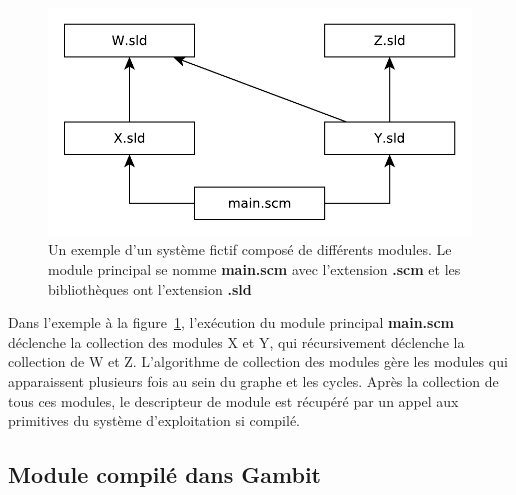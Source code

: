 \begin{figure}[ht]
  \includegraphics{figures/system-example}
  \caption{Un exemple d'un système fictif composé de différents modules.
  Le module principal se nomme \textbf{main.scm} avec l'extension \textbf{.scm}
  et les bibliothèques ont l'extension \textbf{.sld}}
  \label{fig:system-dependency-example}
\end{figure}


Dans l'exemple à la figure~\ref{fig:system-dependency-example}, l'exécution du module principal
\textbf{main.scm} déclenche la collection des modules X et Y, qui récursivement
déclenche la collection de W et Z.  L'algorithme de collection des modules gère
les modules qui apparaissent plusieurs fois au sein du graphe et les cycles.  Après la
collection de tous ces modules, le descripteur de module est
récupéré par un appel aux primitives du système d'exploitation si compilé.


\subsection{Module compilé dans Gambit}

